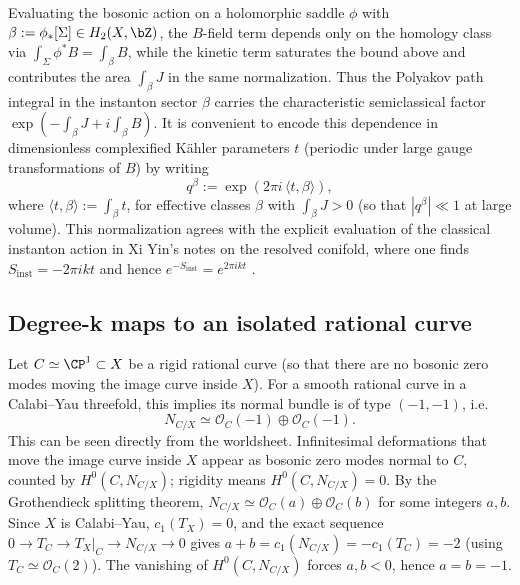 \documentclass[12pt]{article}
\begin{document}
Evaluating the bosonic action on a holomorphic saddle $\phi$ with
$\beta:=\phi_*[\Sigma]\in H_2(X,\bZ)$, the
$B$-field term depends only on the homology class via
$\int_\Sigma \phi^*B=\int_\beta B$, while the kinetic term saturates the bound
above and contributes the area $\int_\beta J$ in the same normalization. Thus
the Polyakov path integral in the instanton sector $\beta$ carries the
characteristic semiclassical factor $\exp(-\int_\beta J+i\int_\beta B)$. It is
convenient to encode this dependence in dimensionless complexified K\"ahler
parameters $t$ (periodic under large gauge transformations of $B$) by writing
\begin{equation}
  q^\beta := \exp\!\left(2\pi i\,\langle t,\beta\rangle\right),
\end{equation}
where $\langle t,\beta\rangle:=\int_\beta t$, for effective classes $\beta$ with
$\int_\beta J>0$ (so that $|q^\beta|\ll 1$ at
large volume). This normalization agrees with the explicit evaluation of the
classical instanton action in Xi Yin's notes on the resolved conifold, where one
finds $S_{\mathrm{inst}}=-2\pi i k t$ and hence $e^{-S_{\mathrm{inst}}}=e^{2\pi i
k t}$ \cite[Eq.~(19.184)]{Yin:FoundationsStringTheory}.

\subsection{Degree-k maps to an isolated rational curve}
Let $C\simeq\CP^1\subset X$ be a rigid rational curve (so that there are no
bosonic zero modes moving the image curve inside $X$). For a smooth rational
curve in a Calabi--Yau threefold, this implies its normal bundle is of type
$(-1,-1)$, i.e.
\begin{equation}
  N_{C/X}\simeq \mathcal{O}_C(-1)\oplus \mathcal{O}_C(-1).
\end{equation}
This can be seen directly from the worldsheet. Infinitesimal
deformations that move the image curve inside $X$ appear as bosonic zero modes
normal to $C$, counted by $H^0(C,N_{C/X})$; rigidity means $H^0(C,N_{C/X})=0$.
By the Grothendieck splitting theorem,
$N_{C/X}\simeq\mathcal{O}_C(a)\oplus\mathcal{O}_C(b)$ for some integers $a,b$.
Since $X$ is Calabi--Yau, $c_1(T_X)=0$, and the exact sequence
$0\to T_C\to T_X|_C\to N_{C/X}\to 0$ gives
$a+b=c_1(N_{C/X})=-c_1(T_C)=-2$ (using $T_C\simeq\mathcal{O}_C(2)$). The
vanishing of $H^0(C,N_{C/X})$ forces $a,b<0$, hence $a=b=-1$.
\end{document}
